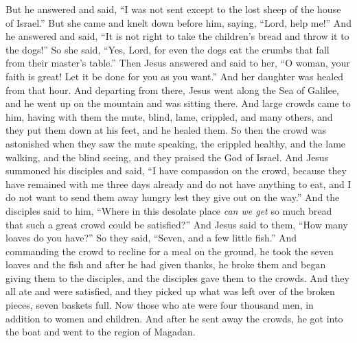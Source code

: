 \begin{biblechapter}
\verse But he answered and said, “I was not sent except to the lost sheep of the house of Israel.”
\verse But she came and knelt down before him, saying, “Lord, help me!”
\verse And he answered and said, “It is not right to take the children’s bread and throw it to the dogs!”
\verse So she said, “Yes, Lord, for even the dogs eat the crumbs that fall from their master’s table.”
\verse Then Jesus answered and said to her, “O woman, your faith is great! Let it be done for you as you want.” And her daughter was healed from that hour.
 And departing from there, Jesus went along the Sea of Galilee, and he went up on the mountain and was sitting there.
\verse And large crowds came to him, having with them the mute, blind, lame, crippled, and many others, and they put them down at his feet, and he healed them.
\verse So then the crowd was astonished when they saw the mute speaking, the crippled healthy, and the lame walking, and the blind seeing, and they praised the God of Israel.
 And Jesus summoned his disciples and said, “I have compassion on the crowd, because they have remained with me three days already and do not have anything to eat, and I do not want to send them away hungry lest they give out on the way.”
\verse And the disciples said to him, “Where in this desolate place \textit{can we get} so much bread that such a great crowd could be satisfied?”
\verse And Jesus said to them, “How many loaves do you have?” So they said, “Seven, and a few little fish.”
\verse And commanding the crowd to recline for a meal on the ground,
\verse he took the seven loaves and the fish and after he had given thanks, he broke them and began giving them to the disciples, and the disciples gave them to the crowds.
\verse And they all ate and were satisfied, and they picked up what was left over of the broken pieces, seven baskets full.
\verse Now those who ate were four thousand men, in addition to women and children.
\verse And after he sent away the crowds, he got into the boat and went to the region of Magadan.
\end{biblechapter}

